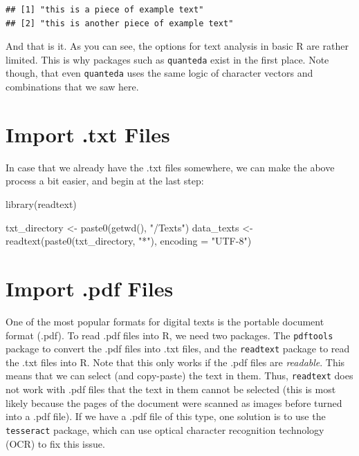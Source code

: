 \documentclass[
]{book}
\newenvironment{Shaded}{\begin{snugshade}}{\end{snugshade}}
\newcommand{\AttributeTok}[1]{\textcolor[rgb]{0.77,0.63,0.00}{#1}}
\newcommand{\FunctionTok}[1]{\textcolor[rgb]{0.00,0.00,0.00}{#1}}
\newcommand{\NormalTok}[1]{#1}
\newcommand{\OtherTok}[1]{\textcolor[rgb]{0.56,0.35,0.01}{#1}}
\newcommand{\StringTok}[1]{\textcolor[rgb]{0.31,0.60,0.02}{#1}}
\begin{document}
\begin{verbatim}
## [1] "this is a piece of example text"      
## [2] "this is another piece of example text"
\end{verbatim}

And that is it. As you can see, the options for text analysis in basic R are rather limited. This is why packages such as \texttt{quanteda} exist in the first place. Note though, that even \texttt{quanteda} uses the same logic of character vectors and combinations that we saw here.

\hypertarget{import-.txt-files}{%
\section{Import .txt Files}\label{import-.txt-files}}

In case that we already have the .txt files somewhere, we can make the above process a bit easier, and begin at the last step:

\begin{Shaded}
\begin{Highlighting}[]
\FunctionTok{library}\NormalTok{(readtext)}

\NormalTok{txt\_directory }\OtherTok{\textless{}{-}} \FunctionTok{paste0}\NormalTok{(}\FunctionTok{getwd}\NormalTok{(), }\StringTok{"/Texts"}\NormalTok{)}
\NormalTok{data\_texts }\OtherTok{\textless{}{-}} \FunctionTok{readtext}\NormalTok{(}\FunctionTok{paste0}\NormalTok{(txt\_directory, }\StringTok{"*"}\NormalTok{), }\AttributeTok{encoding =} \StringTok{"UTF{-}8"}\NormalTok{)}
\end{Highlighting}
\end{Shaded}

\hypertarget{import-.pdf-files}{%
\section{Import .pdf Files}\label{import-.pdf-files}}

One of the most popular formats for digital texts is the portable document format (.pdf). To read .pdf files into R, we need two packages. The \texttt{pdftools} package to convert the .pdf files into .txt files, and the \texttt{readtext} package to read the .txt files into R. Note that this only works if the .pdf files are \emph{readable}. This means that we can select (and copy-paste) the text in them. Thus, \texttt{readtext} does not work with .pdf files that the text in them cannot be selected (this is most likely because the pages of the document were scanned as images before turned into a .pdf file). If we have a .pdf file of this type, one solution is to use the \texttt{tesseract} package, which can use optical character recognition technology (OCR) to fix this issue.
\end{document}
